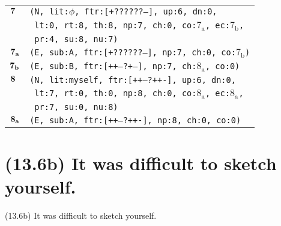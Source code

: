 \documentclass{article}
\begin{document}
\begin{minipage}{\textwidth}
{\begin{tabular}{|r|l|}
    ${\textbf{\textrm{7}}_{\phantom{z}}}$ & \texttt{\texttt{(N,~lit:$\phi$,~ftr:[+??????--],~up:6,~dn:0,}} \\
    & \texttt{\texttt{~lt:0,~rt:8,~th:8,~np:7,~ch:0,~co:${\textrm{7}_{\textrm{a}}}$,~ec:${\textrm{7}_{\textrm{b}}}$,}} \\
    & \texttt{\texttt{~pr:4,~su:8,~nu:7)}} \\
    ${\textbf{\textrm{7}}_{\textbf{\textrm{a}}}}$ & \texttt{\texttt{(E,~sub:A,~ftr:[+??????--],~np:7,~ch:0,~co:${\textrm{7}_{\textrm{b}}}$)}} \\
    ${\textbf{\textrm{7}}_{\textbf{\textrm{b}}}}$ & \texttt{\texttt{(E,~sub:B,~ftr:[++---?+--],~np:7,~ch:${\textrm{8}_{\textrm{a}}}$,~co:0)}} \\
    ${\textbf{\textrm{8}}_{\phantom{z}}}$ & \texttt{\texttt{(N,~lit:myself,~ftr:[++---?++-],~up:6,~dn:0,}} \\
    & \texttt{\texttt{~lt:7,~rt:0,~th:0,~np:8,~ch:0,~co:${\textrm{8}_{\textrm{a}}}$,~ec:${\textrm{8}_{\textrm{a}}}$,}} \\
    & \texttt{\texttt{~pr:7,~su:0,~nu:8)}} \\
    ${\textbf{\textrm{8}}_{\textbf{\textrm{a}}}}$ & \texttt{\texttt{(E,~sub:A,~ftr:[++---?++-],~np:8,~ch:0,~co:0)}} \\
    \hline
  \end{tabular}
  }
\end{minipage}
\bigbreak

\clearpage

%
%

\section*{(13.6b) It was difficult to sketch yourself.}

\bigbreak
\begin{enumerate*}
\item[(13.6b)] It was difficult to sketch yourself.
\end{enumerate*}
\bigbreak
\end{document}
